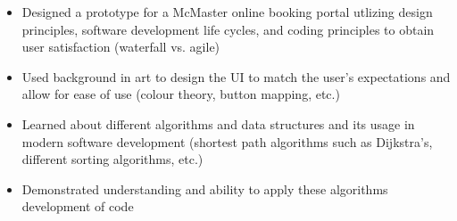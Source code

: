 \documentclass[10pt,a4paper,ragged2e,withhyper,darkmode]{altacv}
\begin{document}
\begin{paracol}{1}
            \begin{itemize}
                    \item{Designed a prototype for a McMaster online booking portal utlizing design principles, software development life cycles, and coding principles to obtain user satisfaction (waterfall vs. agile)}
                    \item{Used background in art to design the UI to match the user's expectations and allow for ease of use (colour theory, button mapping, etc.)}
            \end{itemize}
        \divider
            \begin{itemize}
                \item{Learned about different algorithms and data structures and its usage in modern software development (shortest path algorithms such as Dijkstra's, different sorting algorithms, etc.)}
                \item{Demonstrated understanding and ability to apply these algorithms development of code}
            \end{itemize}
            
            \begin{sloppypar}
            \end{sloppypar}

            \begin{sloppypar}
            \end{sloppypar}

            \begin{sloppypar}
            \end{sloppypar}

            \begin{sloppypar}
            \end{sloppypar}
    \end{paracol}
\end{document}
